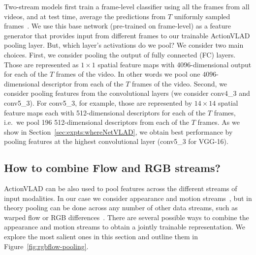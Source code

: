 \documentclass[10pt,twocolumn,letterpaper]{article}
\newcommand{\methodTag}[0]{ActionVLAD}
\begin{document}
Two-stream models first train a frame-level classifier using all the frames
from all videos, and at test time, average the predictions from $T$
uniformly sampled frames~\cite{Simonyan_14b,WangL_16a}. We use
this base network (pre-trained on frame-level) as a feature generator that provides input  from different frames to our trainable \methodTag{} pooling layer.
But, which layer's activations do we pool?
We consider two main choices.
First, we consider pooling the output of fully connected (FC) layers. Those are represented as $1\times 1 $ spatial feature maps with 4096-dimensional output for each of the $T$ frames of the video.  In other words we pool one $4096$-dimensional descriptor from each of the $T$ frames of the video.  Second, we consider pooling features from the convolutional layers (we consider conv4\_3 and conv5\_3). For conv5\_3, for example, those are represented by $14\times 14$ spatial feature maps each with 512-dimensional descriptors for each of the $T$ frames, i.e.\ we pool 196 512-dimensional descriptors from each of the $T$ frames. 
As we show in Section~\ref{sec:expts:whereNetVLAD}, we obtain 
best performance by pooling features at the highest convolutional layer
(conv5\_3 for VGG-16).







\subsection{How to combine Flow and RGB streams?}\label{sec:combine-flow-rgb}

\methodTag{} can be also used to pool features across the different streams of input
modalities. In our case we consider appearance and motion streams~\cite{Simonyan_14b}, but in theory pooling can be done across any number of other data streams,
such as  warped flow or RGB differences~\cite{WangL_16a}.
There are several possible ways to combine the appearance and motion streams to obtain a
jointly trainable representation. We explore the most salient ones in this section and outline them in Figure~\ref{fig:rgbflow-pooling}.
\end{document}
